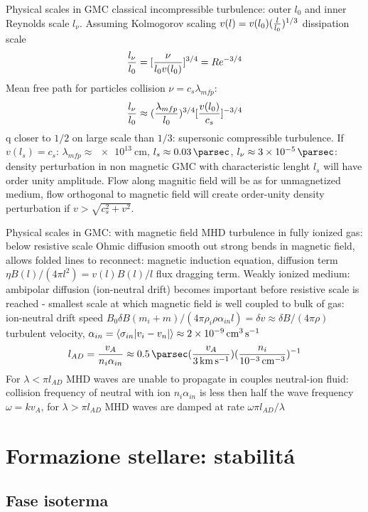 \begin{frame}{Physical scales in GMC}
classical incompressible turbulence: outer $l_0$ and inner Reynolds scale $l_{\nu}$. Assuming Kolmogorov scaling $v(l)=v(l_0)(\frac{l}{l_0})^{1/3}$ dissipation scale
\[\frac{l_{\nu}}{l_0}=[\frac{\nu}{l_0v(l_0)}]^{3/4}=Re^{-3/4}\]
Mean free path for particles collision $\nu=c_s\lambda_{mfp}$:
\[\frac{l_{\nu}}{l_0}\approx(\frac{\lambda_{mfp}}{l_0})^{3/4}[\frac{v(l_0)}{c_s}]^{-3/4}\]
q closer to $1/2$ on large scale than $1/3$: supersonic compressible turbulence.
If $v(l_s)=c_s$: $\lambda_{mfp}\approx\SI{e13}{\cm}$, $l_s\approx\SI{0.03}{\parsec}$, $l_{\nu}\approx\SI{3e-5}{\parsec}$: density perturbation in non magnetic GMC with characteristic lenght $l_s$ will have order unity amplitude.
Flow along magnitic field will be as for unmagnetized medium, flow orthogonal to magnetic field will create order-unity density perturbation if  $v>\sqrt{c_s^2+v^2}$.
\end{frame}

\begin{frame}{Physical scales in GMC: with magnetic field}
MHD turbulence in fully ionized gas: below resistive scale Ohmic diffusion smooth out strong bends in magnetic field, allows folded lines to reconnect: magnetic induction equation, diffusion term $\eta B(l)/(4\pi l^2)=v(l)B(l)/l$ flux dragging term.
Weakly ionized medium: ambipolar diffusion (ion-neutral drift) becomes important before resistive scale is reached - smallest scale at which magnetic field is well coupled to bulk of gas: ion-neutral drift speed $B_0\delta B(m_i+m)/(4\pi\rho_i\rho\alpha_{in}l)=\delta v\approx\delta B/(4\pi\rho)$ turbulent velocity, $\alpha_{in}=\exv{\sigma_{in}|v_i-v_n|}\approx\SI{2e-9}{\cubic\cm\per\second}$
\[l_{AD}=\frac{v_A}{n_i\alpha_{in}}\approx\SI{0.5}{\parsec}(\frac{v_A}{\SI{3}{\kilo\meter\per\second}})(\frac{n_i}{\SI{e-3}{\per\cubic\cm}})\expy{-1}\]
For $\lambda<\pi l_{AD}$ MHD waves are unable to propagate in couples neutral-ion fluid: collision frequency of neutral with ion $n_i\alpha_{in}$ is less then half the wave frequency $\omega=kv_A$, for $\lambda>\pi l_{AD}$ MHD waves are damped at rate $\omega\pi l_{AD}/\lambda$
\end{frame}

\section{Formazione stellare: stabilit\'a}

\subsection{Fase isoterma}

